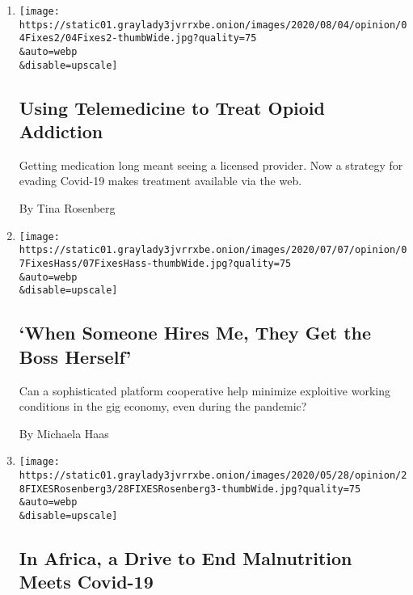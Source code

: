 \begin{enumerate}
\def\labelenumi{\arabic{enumi}.}
\item
  \href{/2020/08/04/opinion/opioid-telemedicine-covid.html}{}

  \texttt{[image: https://static01.graylady3jvrrxbe.onion/images/2020/08/04/opinion/04Fixes2/04Fixes2-thumbWide.jpg?quality=75\\\&auto=webp\\\&disable=upscale]}

  \hypertarget{using-telemedicine-to-treat-opioid-addiction}{%
  \subsection{Using Telemedicine to Treat Opioid
  Addiction}\label{using-telemedicine-to-treat-opioid-addiction}}

  Getting medication long meant seeing a licensed provider. Now a
  strategy for evading Covid-19 makes treatment available via the web.

  By Tina Rosenberg
\item
  \href{/2020/07/07/opinion/gig-economy-immigrants-fair-wage.html}{}

  \texttt{[image: https://static01.graylady3jvrrxbe.onion/images/2020/07/07/opinion/07FixesHass/07FixesHass-thumbWide.jpg?quality=75\\\&auto=webp\\\&disable=upscale]}

  \hypertarget{when-someone-hires-me-they-get-the-boss-herself}{%
  \subsection{`When Someone Hires Me, They Get the Boss
  Herself'}\label{when-someone-hires-me-they-get-the-boss-herself}}

  Can a sophisticated platform cooperative help minimize exploitive
  working conditions in the gig economy, even during the pandemic?

  By Michaela Haas
\item
  \href{/2020/05/28/opinion/coronavirus-africa-malnutrition.html}{}

  \texttt{[image: https://static01.graylady3jvrrxbe.onion/images/2020/05/28/opinion/28FIXESRosenberg3/28FIXESRosenberg3-thumbWide.jpg?quality=75\\\&auto=webp\\\&disable=upscale]}

  \hypertarget{in-africa-a-drive-to-end-malnutrition-meets-covid-19}{%
  \subsection{In Africa, a Drive to End Malnutrition Meets
  Covid-19}\label{in-africa-a-drive-to-end-malnutrition-meets-covid-19}}


\end{enumerate}
